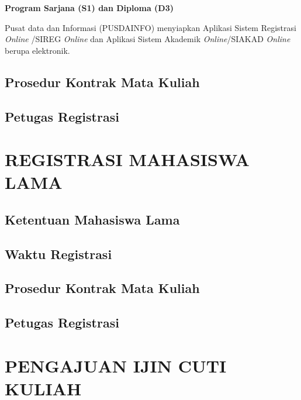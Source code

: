 \documentclass[
]{book}
\begin{document}
\textbf{Program Sarjana (S1) dan Diploma (D3)}

Pusat data dan Informasi (PUSDAINFO) menyiapkan Aplikasi Sistem Registrasi \emph{Online} /SIREG \emph{Online} dan Aplikasi Sistem Akademik \emph{Online}/SIAKAD \emph{Online} berupa elektronik.

\hypertarget{prosedur-kontrak-mata-kuliah}{%
\section{Prosedur Kontrak Mata Kuliah}\label{prosedur-kontrak-mata-kuliah}}

\hypertarget{petugas-registrasi}{%
\section{Petugas Registrasi}\label{petugas-registrasi}}

\hypertarget{registrasi-mahasiswa-lama}{%
\chapter{REGISTRASI MAHASISWA LAMA}\label{registrasi-mahasiswa-lama}}

\hypertarget{ketentuan-mahasiswa-lama}{%
\section{Ketentuan Mahasiswa Lama}\label{ketentuan-mahasiswa-lama}}

\hypertarget{waktu-registrasi}{%
\section{Waktu Registrasi}\label{waktu-registrasi}}

\hypertarget{prosedur-kontrak-mata-kuliah}{%
\section{Prosedur Kontrak Mata Kuliah}\label{prosedur-kontrak-mata-kuliah}}

\hypertarget{petugas-registrasi}{%
\section{Petugas Registrasi}\label{petugas-registrasi}}

\hypertarget{pengajuan-ijin-cuti-kuliah}{%
\chapter{PENGAJUAN IJIN CUTI KULIAH}\label{pengajuan-ijin-cuti-kuliah}}
\end{document}
